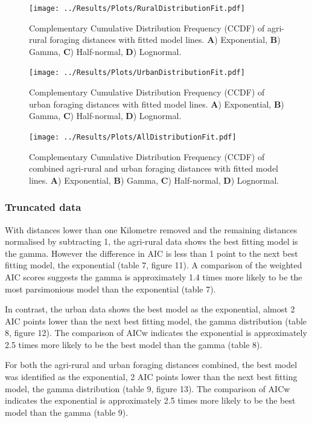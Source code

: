 \documentclass[11pt,usenames,dvipsnames,a4paper]{article}
\begin{document}
\begin{figure}[H]
	\centering
	\texttt{[image: ../Results/Plots/RuralDistributionFit.pdf]}
	\caption{Complementary Cumulative Distribution Frequency (CCDF) of agri-rural foraging distances with fitted model lines. \textbf{A}) Exponential, \textbf{B}) Gamma, \textbf{C}) Half-normal, \textbf{D}) Lognormal.}
\end{figure}

\begin{figure}[H]
	\centering
	\texttt{[image: ../Results/Plots/UrbanDistributionFit.pdf]}
	\caption{Complementary Cumulative Distribution Frequency (CCDF) of urban foraging distances with fitted model lines. \textbf{A}) Exponential, \textbf{B}) Gamma, \textbf{C}) Half-normal, \textbf{D}) Lognormal.}
\end{figure}

\begin{figure}[H]
	\centering
	\texttt{[image: ../Results/Plots/AllDistributionFit.pdf]}
	\caption{Complementary Cumulative Distribution Frequency (CCDF) of combined agri-rural and urban foraging distances with fitted model lines. \textbf{A}) Exponential, \textbf{B}) Gamma, \textbf{C}) Half-normal, \textbf{D}) Lognormal.}
\end{figure}

\subsubsection{Truncated data}

\begin{linenumbers}
\hspace{\parindent}
With distances lower than one Kilometre removed and the remaining distances normalised by subtracting 1, the agri-rural data shows the best fitting model is the gamma. However the difference in AIC is less than 1 point to the next best fitting model, the exponential (table 7, figure 11). A comparison of the weighted AIC scores suggests the gamma is approximately 1.4 times more likely to be the most parsimonious model than the exponential (table 7).

In contrast, the urban data shows the best model as the exponential, almost 2 AIC points lower than the next best fitting model, the gamma distribution (table 8, figure 12). The comparison of AICw indicates the exponential is approximately 2.5 times more likely to be the best model than the gamma (table 8).

For both the agri-rural and urban foraging distances combined, the best model was identified as the exponential, 2 AIC points lower than the next best fitting model, the gamma distribution (table 9, figure 13). The comparison of AICw indicates the exponential is approximately 2.5 times more likely to be the best model than the gamma (table 9). 
\end{linenumbers}
\end{document}

